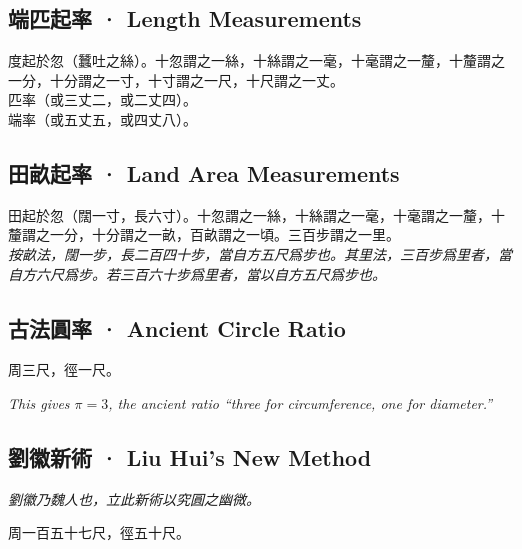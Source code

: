 \documentclass[11pt,a4paper]{article}
\newcommand{\cnote}[1]{\textcolor{notecolor}{\textit{#1}}}
\begin{document}
\subsection{端匹起率 · Length Measurements}

\noindent
度起於忽（蠶吐之絲）。十忽謂之一絲，十絲謂之一毫，十毫謂之一釐，十釐謂之一分，十分謂之一寸，十寸謂之一尺，十尺謂之一丈。\\[2pt]
匹率（或三丈二，或二丈四）。\\[2pt]
端率（或五丈五，或四丈八）。

\subsection{田畝起率 · Land Area Measurements}

\noindent
田起於忽（闊一寸，長六寸）。十忽謂之一絲，十絲謂之一毫，十毫謂之一釐，十釐謂之一分，十分謂之一畝，百畝謂之一頃。三百步謂之一里。\\[2pt]
\textit{按畝法，闊一步，長二百四十步，當自方五尺爲步也。其里法，三百步爲里者，當自方六尺爲步。若三百六十步爲里者，當以自方五尺爲步也。}

\subsection{古法圓率 · Ancient Circle Ratio}

\noindent
周三尺，徑一尺。

\cnote{This gives $\pi = 3$, the ancient ratio ``three for circumference, one for diameter.''}

\subsection{劉徽新術 · Liu Hui's New Method}

\textit{劉徽乃魏人也，立此新術以究圓之幽微。}

\noindent
周一百五十七尺，徑五十尺。
\end{document}
